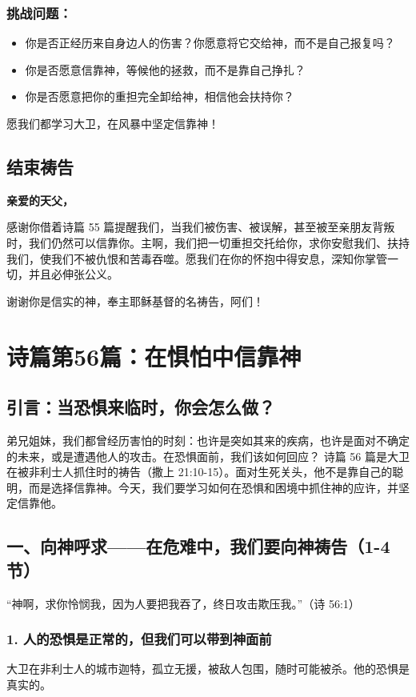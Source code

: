 \documentclass[a4paper, 12pt]{article}
\begin{document}
\subsubsection*{挑战问题：}
\begin{itemize}
    \item 你是否正经历来自身边人的伤害？你愿意将它交给神，而不是自己报复吗？
    \item 你是否愿意信靠神，等候他的拯救，而不是靠自己挣扎？

    \item 你是否愿意把你的重担完全卸给神，相信他会扶持你？

\end{itemize}

愿我们都学习大卫，在风暴中坚定信靠神！

\subsection*{结束祷告}
\textbf{亲爱的天父，}

感谢你借着诗篇 55 篇提醒我们，当我们被伤害、被误解，甚至被至亲朋友背叛时，我们仍然可以信靠你。主啊，我们把一切重担交托给你，求你安慰我们、扶持我们，使我们不被仇恨和苦毒吞噬。愿我们在你的怀抱中得安息，深知你掌管一切，并且必伸张公义。

谢谢你是信实的神，奉主耶稣基督的名祷告，阿们！
\newpage
\section{诗篇第56篇：在惧怕中信靠神}
\subsection*{引言：当恐惧来临时，你会怎么做？}
弟兄姐妹，我们都曾经历害怕的时刻：也许是突如其来的疾病，也许是面对不确定的未来，或是遭遇他人的攻击。在恐惧面前，我们该如何回应？
诗篇 56 篇是大卫在被非利士人抓住时的祷告（撒上 21:10-15）。面对生死关头，他不是靠自己的聪明，而是选择信靠神。今天，我们要学习如何在恐惧和困境中抓住神的应许，并坚定信靠他。

\subsection*{一、向神呼求——在危难中，我们要向神祷告（1-4节）}
“神啊，求你怜悯我，因为人要把我吞了，终日攻击欺压我。”（诗 56:1）

\subsubsection*{1. 人的恐惧是正常的，但我们可以带到神面前}
\hspace{0.6cm}大卫在非利士人的城市迦特，孤立无援，被敌人包围，随时可能被杀。他的恐惧是真实的。
\end{document}
